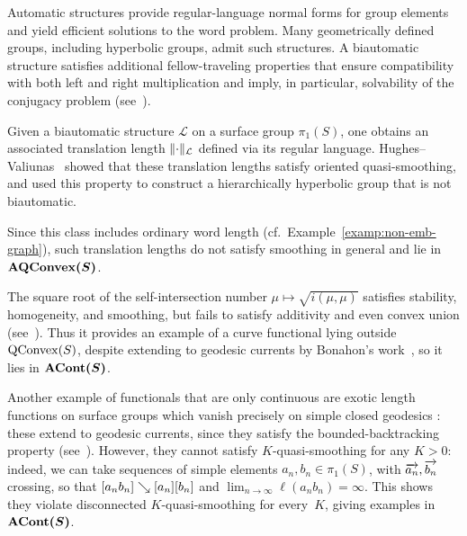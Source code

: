 \begin{example}
\label{examp:biautomatic}
Automatic structures provide regular-language normal forms for group
elements and yield efficient solutions to the word problem. Many
geometrically defined groups, including hyperbolic groups, admit such
structures. A biautomatic structure satisfies additional
fellow-traveling properties that ensure compatibility with both left
and right multiplication and imply, in particular, solvability of the
conjugacy problem (see~\cite[Section~2.2]{HV24:Biautomaticity}).

Given a biautomatic structure $\mathcal{L}$ on a surface group
$\pi_1(S)$, one obtains an associated translation length
$\lVert\cdot\rVert_{\mathcal{L}}$ defined via its regular language.
Hughes--Valiunas~\cite[Proposition~4.2]{HV24:Biautomaticity} showed that
these translation lengths satisfy oriented quasi-smoothing, and used
this property to construct a hierarchically hyperbolic group that is
not biautomatic. 

Since this class includes ordinary word length (cf.\
Example~\ref{examp:non-emb-graph}), such translation lengths do not
satisfy smoothing in general and lie in $\bm{\mathrm{AQConvex}(S)}$.
\end{example}

\begin{example}
  \label{examp:self-intersect}
The square root of the self-intersection number $\mu \mapsto
\sqrt{i(\mu,\mu)}$ satisfies stability,
homogeneity, and smoothing, but fails to satisfy additivity and even
convex union (see~\cite[Example~1.12]{MGT21:Smoothings}). 
Thus it provides an example of a curve functional lying outside
$\mathrm{QConvex}(S)$, despite extending to geodesic currents by
Bonahon’s work~\cite{Bonahon86:EndsHyperbolicManifolds}, so it lies in
$\bm{\mathrm{ACont}(S)}$.
\end{example}

\begin{example}\label{examp:exotic-lengths}
  Another example of functionals that are only continuous are exotic length functions on surface groups which vanish precisely on simple closed geodesics \cite[Section~7]{CMGR26:GreenMetrics}: these extend to geodesic currents, since they satisfy the bounded\hyp backtracking property (see~\cite[Section~6]{CMGR26:GreenMetrics}). However, they cannot satisfy $K$-quasi-smoothing for any $K>0$: indeed, we can take sequences of simple elements $a_n,b_n \in \pi_1(S)$, with $\overrightarrow{a_n}, \overrightarrow{b_n}$ crossing, so that $[a_nb_n] \mathrel{\searrow} [a_n][b_n]$ and $\lim_{n\to
    \infty}\ell(a_n b_n) = \infty$. This shows they violate disconnected $K$-quasi-smoothing for every~$K$, giving examples in $\bm{\mathrm{ACont}(S)}$.
\end{example}

